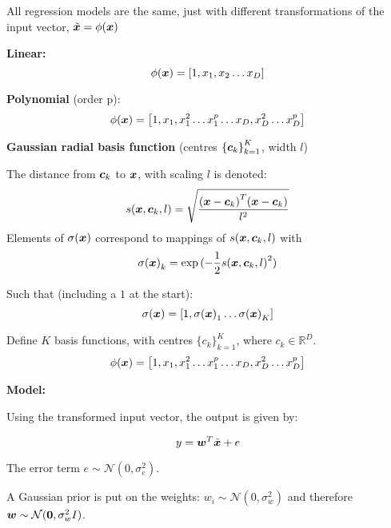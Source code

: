 \documentclass[../../main.tex]{subfiles}
\begin{document}
All regression models are the same, just with different transformations of the input vector, $ \tilde{\bm{x}} = \phi{( \bm{x} )}$

\textbf{Linear:}
\[ \phi(\bm{x}) = \left[ 1, x_1, x_2 \ldots x_D \right] \]

\textbf{Polynomial} (order p):
\[ \phi(\bm{x}) = \left[ 1, x_1, x_1^2 \ldots x_1^p \ldots x_D, x_D^2 \ldots x_D^p \right] \]

\textbf{Gaussian radial basis function} (centres ${\{\bm{c}_k\}}_{k=1}^{K}$, width $l$)

The distance from $\bm{c}_k$ to $\bm{x}$, with scaling $l$ is denoted:
\[ s(\bm{x}, \bm{c}_k, l) = \sqrt{
    \frac
        {{(\bm{x} - \bm{c}_k)}^T{(\bm{x} - \bm{c}_k)}}
        {l^2}
    }
\]
Elements of $\sigma(\bm{x})$ correspond to mappings of $s(\bm{x}, \bm{c}_k, l)$ with
\[ \sigma{( \bm{x} )}_k = \exp{(-\frac{1}{2}{s( \bm{x} ,  \bm{c} _k, l)}^2)} \]

Such that (including a $1$ at the start):
\[ \sigma(\bm{x}) = \left[ 1, \sigma{( \bm{x} )}_1 \ldots \sigma{( \bm{x} )}_K \right] \]

Define $K$ basis functions, with centres ${\{c_k\}}_{k=1}^{K}$, where $c_k \in \mathbb{R}^D$.
\[ \phi(\bm{x}) = \left[ 1, x_1, x_1^2 \ldots x_1^p \ldots x_D, x_D^2 \ldots x_D^p \right] \]

\textbf{Model:}

Using the transformed input vector, the output is given by:

\[ y = \bm{w}^T \tilde{\bm{x}} + e\]

The error term $e \sim \mathcal{N}(0, \sigma_e^2)$.

A Gaussian prior is put on the weights: $ w_i \sim  \mathcal{N}(0, \sigma_w^2) $ and therefore $ \bm{w} \sim \mathcal{N}(\bm{0}, \sigma_w^2I)$.
\end{document}
